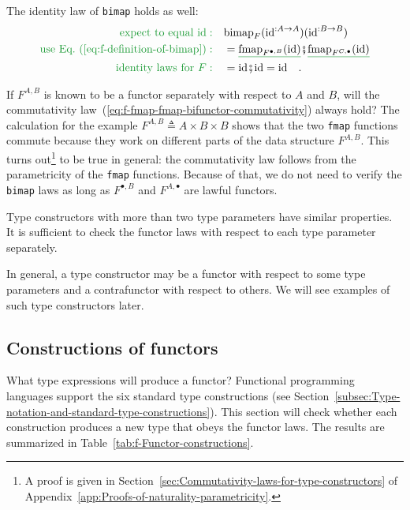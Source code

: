 The identity law of \lstinline!bimap! holds as well:
\begin{align*}
{\color{greenunder}\text{expect to equal }\text{id}:}\quad & \text{bimap}_{F}(\text{id}^{:A\rightarrow A})(\text{id}^{:B\rightarrow B})\\
{\color{greenunder}\text{use Eq.~(\ref{eq:f-definition-of-bimap})}:}\quad & =\gunderline{\text{fmap}_{F^{\bullet,B}}(\text{id})}\bef\gunderline{\text{fmap}_{F^{C,\bullet}}(\text{id})}\\
{\color{greenunder}\text{identity laws for }F:}\quad & =\text{id}\bef\text{id}=\text{id}\quad.
\end{align*}

If $F^{A,B}$ is known to be a functor separately with respect to
$A$ and $B$, will the commutativity law~(\ref{eq:f-fmap-fmap-bifunctor-commutativity})
always hold? The calculation for the example $F^{A,B}\triangleq A\times B\times B$
shows that the two \lstinline!fmap! functions commute because they
work on different parts of the data structure $F^{A,B}$. This turns
out\footnote{A proof is given in Section~\ref{sec:Commutativity-laws-for-type-constructors}
of Appendix~\ref{app:Proofs-of-naturality-parametricity}.} to be true in general: the commutativity law follows from the parametricity
of the \lstinline!fmap! functions. Because of that, we do not need
to verify the \lstinline!bimap! laws as long as $F^{\bullet,B}$
and $F^{A,\bullet}$ are lawful functors.

Type constructors with more than two type parameters have similar
properties. It is sufficient to check the functor laws with respect
to each type parameter separately.

In general, a type constructor may be a functor with respect to some
type parameters and a contrafunctor with respect to others. We will
see examples of such type constructors later.

\subsection{Constructions of functors\label{subsec:f-Functor-constructions}}

What type expressions will produce a functor? Functional programming
languages support the six standard type constructions (see Section~\ref{subsec:Type-notation-and-standard-type-constructions}).
This section will check whether each construction produces a new type
that obeys the functor laws. The results are summarized in Table~\ref{tab:f-Functor-constructions}.

